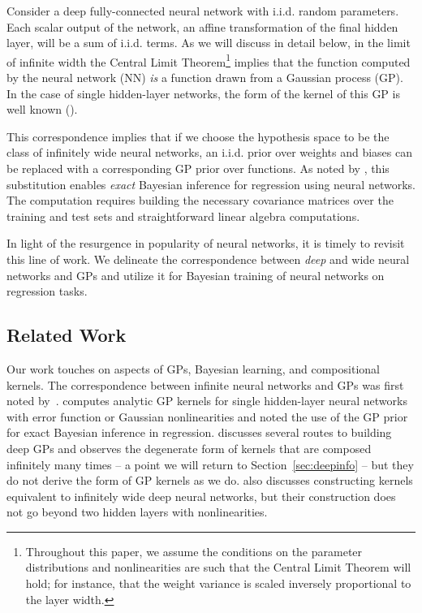 \documentclass{article} %
\begin{document}
Consider a deep fully-connected neural network with i.i.d. random parameters. Each scalar output of the network, an affine transformation of the final hidden layer, will be a sum of i.i.d. terms. As we will discuss in detail below, in the limit of infinite width the Central Limit Theorem\footnote{Throughout this paper, we assume the conditions on the parameter distributions and nonlinearities are such that the Central Limit Theorem will hold; for instance, that the weight variance is scaled inversely proportional to the layer width.} implies that the function computed by the neural network (NN) \emph{is} a function drawn from a Gaussian process (GP).
In the case of single hidden-layer networks, the form of the kernel of this GP is well known (\cite{neal, williams1997}).

This correspondence implies that if we choose the hypothesis space to be the class of infinitely wide neural networks, an i.i.d. prior over weights and biases can be replaced with a corresponding GP prior over functions. As noted by \citep{williams1997}, this substitution enables \emph{exact} Bayesian inference for regression using neural networks. The computation requires building the necessary covariance matrices over the training and test sets and straightforward linear algebra computations.

In light of the resurgence in popularity of neural networks, it is timely to revisit this line of work. We delineate the correspondence between \emph{deep} and wide neural networks and GPs and utilize it for Bayesian training of neural networks on regression tasks.

\subsection{Related Work}


 Our work touches on aspects of GPs, Bayesian learning, and compositional kernels. The correspondence between infinite neural networks and GPs was first noted by~\cite{neal, nealthesis}. \cite{williams1997} computes analytic GP kernels for single hidden-layer neural networks with error function or Gaussian nonlinearities and noted the use of the GP prior for exact Bayesian inference in regression. \cite{duvenaud2014} discusses several routes to building deep GPs and observes the degenerate form of kernels that are composed infinitely many times -- a point we will return to Section~\ref{sec:deepinfo} -- but they do not derive the form of GP kernels as we do. \cite{hazan2015} also discusses constructing kernels equivalent to infinitely wide deep neural networks, but their construction does not go beyond two hidden layers with nonlinearities.
 
\end{document}
